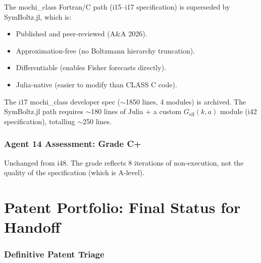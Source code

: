 \documentclass[11pt,a4paper]{article}
\begin{document}
The mochi\_class Fortran/C path (i15--i17 specification) is superseded by SymBoltz.jl, which is:
\begin{itemize}
\item Published and peer-reviewed (A\&A 2026).
\item Approximation-free (no Boltzmann hierarchy truncation).
\item Differentiable (enables Fisher forecasts directly).
\item Julia-native (easier to modify than CLASS C code).
\end{itemize}

The i17 mochi\_class developer spec ($\sim$1850 lines, 4 modules) is archived. The SymBoltz.jl path requires $\sim$180 lines of Julia + a custom $G_{\text{eff}}(k,a)$ module (i42 specification), totalling $\sim$250 lines.

\section{Agent 14 Assessment: Grade C+}

Unchanged from i48. The grade reflects 8 iterations of non-execution, not the quality of the specification (which is A-level).


\part{Patent Portfolio: Final Status for Handoff}
\label{part:patents}

\section{Definitive Patent Triage}
\end{document}
